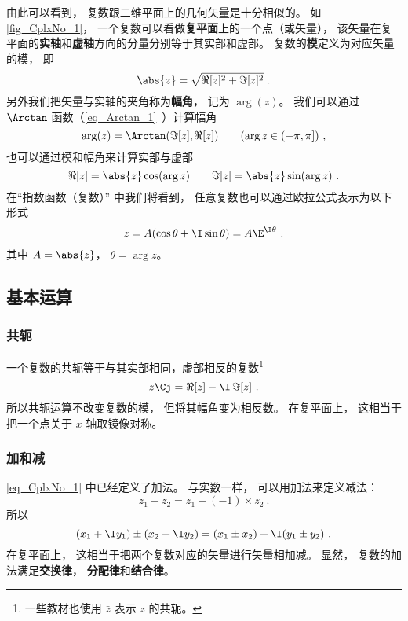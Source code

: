 由此可以看到， 复数跟二维平面上的几何矢量是十分相似的。 如\autoref{fig_CplxNo_1}， 一个复数可以看做\textbf{复平面}上的一个点（或矢量）， 该矢量在复平面的\textbf{实轴}和\textbf{虚轴}方向的分量分别等于其实部和虚部。 复数的\textbf{模}定义为对应矢量的模， 即
\begin{equation}
\abs{z} = \sqrt{\Re[z]^2 + \Im[z]^2}~.
\end{equation}
另外我们把矢量与实轴的夹角称为\textbf{幅角}， 记为 $\arg(z)$。 我们可以通过 $\Arctan$ 函数（\autoref{eq_Arctan_1}~）计算幅角
\begin{equation}\label{eq_CplxNo_5}
\arg(z) = \Arctan(\Im[z], \Re[z])
\qquad (\arg z \in (-\pi, \pi])~,
\end{equation}
也可以通过模和幅角来计算实部与虚部
\begin{equation}
\Re[z] = \abs{z}\cos(\arg z) \qquad \Im[z] = \abs{z}\sin(\arg z)~.
\end{equation}
在“指数函数（复数）” 中我们将看到， 任意复数也可以通过欧拉公式表示为以下形式
\begin{equation}
z = A(\cos\theta + \I\sin\theta) = A\E^{\I\theta}~.
\end{equation}
其中 $A = \abs{z}$， $\theta = \arg z$。

\subsection{基本运算}
\subsubsection{共轭}
一个复数的共轭等于与其实部相同，虚部相反的复数\footnote{一些教材也使用 $\bar z$ 表示 $z$ 的共轭。}
\begin{equation}\label{eq_CplxNo_6}
z\Cj = \Re[z] - \I\, \Im[z]~.
\end{equation}
所以共轭运算不改变复数的模， 但将其幅角变为相反数。 在复平面上， 这相当于把一个点关于 $x$ 轴取镜像对称。

\subsubsection{加和减}
\autoref{eq_CplxNo_1} 中已经定义了加法。 与实数一样， 可以用加法来定义减法：
\begin{equation}
z_1 - z_2 = z_1 + (-1) \times z_2~.
\end{equation}
所以
\begin{equation}
(x_1 + \I y_1) \pm (x_2 + \I y_2) = (x_1 \pm x_2) + \I (y_1 \pm y_2)~.
\end{equation}
在复平面上， 这相当于把两个复数对应的矢量进行矢量相加减。 显然， 复数的加法满足\textbf{交换律}， \textbf{分配律}和\textbf{结合律}。

